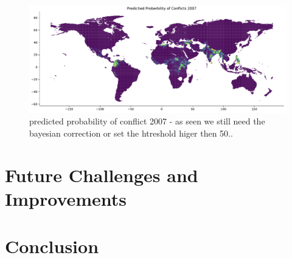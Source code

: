 \documentclass[a4paper]{article}
\begin{document}
\begin{figure}[!htb]
	\centering
	\includegraphics[scale=0.4]{pred_prob_conflicts_2007.pdf}
    \caption{\footnotesize{predicted probability of conflict 2007 - as seen we still need the bayesian correction or set the htreshold higer then 50..}}%
\end{figure}


\pagebreak

\section{Future Challenges and Improvements}


\section{Conclusion}








\end{document}

